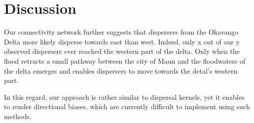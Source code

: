 \documentclass[abstract=on,10pt,a4paper,bibliography=totocnumbered]{article}
\begin{document}
\begin{table}[hbtp]
  \caption{Summary statistics of all GPS relocations that have been recorded on
  dispersing coalitions.}
  \label{GPSData}
  \begin{center}
  \end{center}
\end{table}

\section{Discussion}
Our connectivity network further suggests that dispersers from the Okavango
Delta more likely disperse towards east than west. Indeed, only x out of our y
observed dispersers ever reached the western part of the delta. Only when the
flood retracts a small pathway between the city of Maun and the floodwaters of
the delta emerges and enables dispersers to move towards the detal's western
part.

In this regard, our approach is rather similar to dispersal kernels, yet it
enables to render directional biases, which are currently difficult to implement
using such methods.
\end{document}
